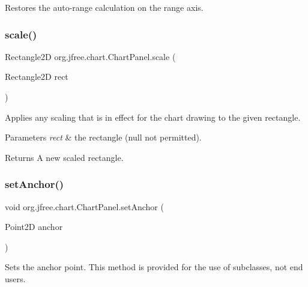 Restores the auto-\/range calculation on the range axis. \mbox{\label{classorg_1_1jfree_1_1chart_1_1_chart_panel_aafacfd58546e57c29101722f096085f8}} 
\subsubsection{\texorpdfstring{scale()}{scale()}}
{\footnotesize\ttfamily Rectangle2D org.\+jfree.\+chart.\+Chart\+Panel.\+scale (\begin{DoxyParamCaption}\item[{Rectangle2D}]{rect }\end{DoxyParamCaption})}

Applies any scaling that is in effect for the chart drawing to the given rectangle.


\begin{DoxyParams}{Parameters}
{\em rect} & the rectangle ({\ttfamily null} not permitted).\\
\hline
\end{DoxyParams}
\begin{DoxyReturn}{Returns}
A new scaled rectangle. 
\end{DoxyReturn}
\mbox{\label{classorg_1_1jfree_1_1chart_1_1_chart_panel_ae38e2217bd007828533fd489f996ace3}} 
\subsubsection{\texorpdfstring{set\+Anchor()}{setAnchor()}}
{\footnotesize\ttfamily void org.\+jfree.\+chart.\+Chart\+Panel.\+set\+Anchor (\begin{DoxyParamCaption}\item[{Point2D}]{anchor }\end{DoxyParamCaption})\hspace{0.3cm}{\ttfamily [protected]}}

Sets the anchor point. This method is provided for the use of subclasses, not end users.


